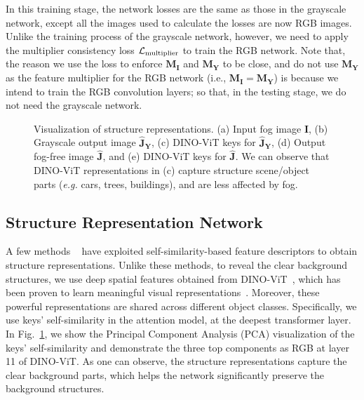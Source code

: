 \documentclass[runningheads]{llncs}
\begin{document}
In this training stage, the network losses are the same as those in the grayscale network, except all the images used to calculate the losses are now RGB images.  
Unlike the training process of the grayscale network, however, we need to apply the multiplier consistency loss $\mathcal{L}_{\rm multiplier}$ to train the RGB network.
Note that, the reason we use the loss to enforce $\mathbf{M_I}$ and $\mathbf{M_Y}$ to be close, and do not use $\mathbf{M_Y}$ as the feature multiplier for the RGB network (i.e., $\mathbf{M_I} = \mathbf{M_Y}$) is  because we intend to train the RGB convolution layers; 
so that, in the testing stage, we do not need the grayscale network. 

\begin{figure}[t]
	\centering
\setcounter{subfigure}{0}
	\hfill
	\hfill
	\hfill
	\hfill
	\hfill
	\caption{Visualization of structure representations.
		(a) Input fog image $\mathbf{I}$, 
		(b) Grayscale output image $\mathbf{\hat{J}_Y}$,
		(c) DINO-ViT keys for $\mathbf{\hat{J}_Y}$, 
		(d) Output fog-free image $\mathbf{\hat{J}}$, 
		and (e) DINO-ViT keys for $\mathbf{\hat{J}}$. 
		We can observe that DINO-ViT representations in (c) capture structure scene/object parts (\textit{e.g.} cars, trees, buildings), and are less affected by fog.}
	\label{fig:structure}
\end{figure}

\subsection{Structure Representation Network}
A few methods ~\cite{shechtman2007matching,zheng2021spatially,kolkin2019style,jin2022unsupervised} have exploited self-similarity-based feature descriptors to obtain structure representations. 
Unlike these methods, to reveal the clear background structures, we use deep spatial features obtained from DINO-ViT~\cite{tumanyan2022splicing}, which has been proven to learn meaningful visual representations~\cite{amir2021deep}. Moreover, these powerful representations are shared across different object classes.
Specifically, we use keys' self-similarity in the attention model, at the deepest transformer layer.
In Fig.~\ref{fig:structure}, we show the Principal Component Analysis (PCA) visualization of the keys' self-similarity and demonstrate the three top components as RGB at layer 11 of DINO-ViT. 
As one can observe, the structure representations capture the clear background parts, which helps the network significantly preserve the background structures.  
\end{document}
